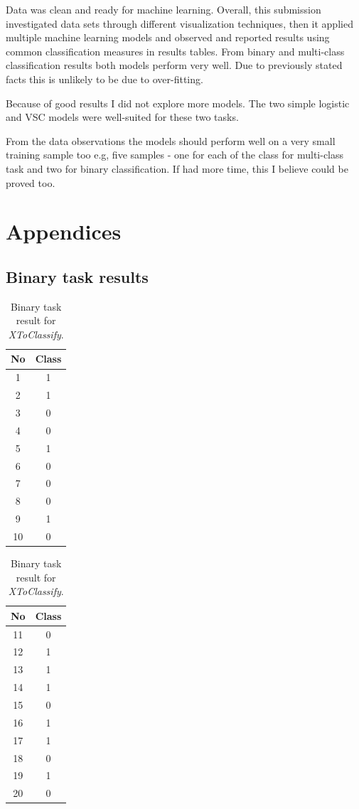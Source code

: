 \documentclass[11pt]{article}
\begin{document}
		Data was clean and ready for machine learning. Overall, this submission investigated data sets through different visualization techniques, then it applied multiple machine learning models and observed and reported results using common classification measures in results tables. From binary and multi-class classification results both models perform very well. Due to previously stated facts this is unlikely to be due to over-fitting. 

		Because of good results I did not explore more models. The two simple logistic and VSC models were well-suited for these two tasks. 

		From the data observations the models should perform well on a very small training sample too e.g, five samples - one for each of the class for multi-class task and two for binary classification. If had more time, this I believe could be proved too. 

	\clearpage
	\appendix
	\section{Appendices}
		\subsection{Binary task results}
		\begin{center}
		  	\begin{table}[h]
		  		\small

		  	\centering

			\begin{tabular}[b]{| c | c|} 
				\hline
				No & Class \\
				\hline
				1 & 1 \\ 2 & 1 \\ 3 & 0 \\ 4 & 0 \\ 5 & 1 \\ 6 & 0 \\ 7 & 0 \\ 8 & 0 \\ 9 & 1 \\ 10 & 0 \\
				\hline
			\end{tabular}
			\begin{tabular}[b]{| c | c|} 
				\hline
				No & Class \\
				\hline
				11 & 0 \\ 12 & 1 \\ 13 & 1 \\ 14 & 1 \\ 15 & 0 \\ 16 & 1 \\ 17 & 1 \\ 18 & 0 \\ 19 & 1 \\ 20 & 0 \\
				\hline
			\end{tabular}
			\caption{Binary task result for \textit{XToClassify}.}
			\label{tbl:final_binary}
			\end{table}
		\end{center}
\end{document}

